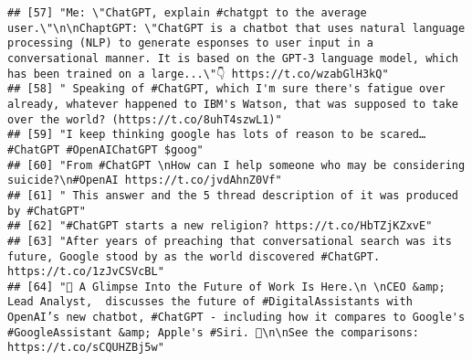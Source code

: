 \documentclass[
]{article}
\begin{document}
\begin{verbatim}
## [57] "Me: \"ChatGPT, explain #chatgpt to the average user.\"\n\nChaptGPT: \"ChatGPT is a chatbot that uses natural language processing (NLP) to generate esponses to user input in a conversational manner. It is based on the GPT-3 language model, which has been trained on a large...\"👇 https://t.co/wzabGlH3kQ"                      
## [58] " Speaking of #ChatGPT, which I'm sure there's fatigue over already, whatever happened to IBM's Watson, that was supposed to take over the world? (https://t.co/8uhT4szwL1)"                                                                                                                                                           
## [59] "I keep thinking google has lots of reason to be scared… #ChatGPT #OpenAIChatGPT $goog"                                                                                                                                                                                                                                                
## [60] "From #ChatGPT \nHow can I help someone who may be considering suicide?\n#OpenAI https://t.co/jvdAhnZ0Vf"                                                                                                                                                                                                                              
## [61] " This answer and the 5 thread description of it was produced by #ChatGPT"                                                                                                                                                                                                                                                             
## [62] "#ChatGPT starts a new religion? https://t.co/HbTZjKZxvE"                                                                                                                                                                                                                                                                              
## [63] "After years of preaching that conversational search was its future, Google stood by as the world discovered #ChatGPT. https://t.co/1zJvCSVcBL"                                                                                                                                                                                        
## [64] "👀 A Glimpse Into the Future of Work Is Here.\n \nCEO &amp; Lead Analyst,  discusses the future of #DigitalAssistants with OpenAI’s new chatbot, #ChatGPT - including how it compares to Google's #GoogleAssistant &amp; Apple's #Siri. 🤖\n\nSee the comparisons: https://t.co/sCQUHZBj5w"                                           

\end{verbatim}
\end{document}
